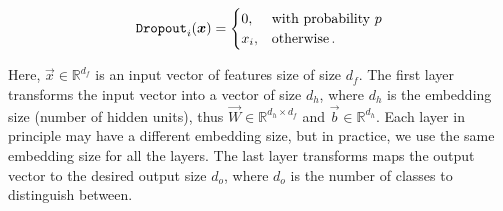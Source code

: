 \begin{equation}
    \texttt{Dropout}_i({\boldsymbol{x}}) = \begin{cases}
        0,   & \text{with probability } p \\
        x_i, & \text{otherwise}\,.
    \end{cases}
\end{equation}

Here, $\vec{x} \in \mathbb{R}^{d_f}$ is an input vector of features size of size $d_f$. The first \Linear layer
transforms the input vector into a vector of size $d_h$, where $d_h$ is the embedding size (number of hidden units),
thus $\vec{W} \in \mathbb{R}^{d_h \times d_f}$ and $\vec{b} \in \mathbb{R}^{d_h}$. Each \Linear layer in principle may
have a different embedding size, but in practice, we use the same embedding size for all the layers. The last \Linear
layer transforms maps the output vector to the desired output size $d_o$, where $d_o$ is the number of classes to
distinguish between.